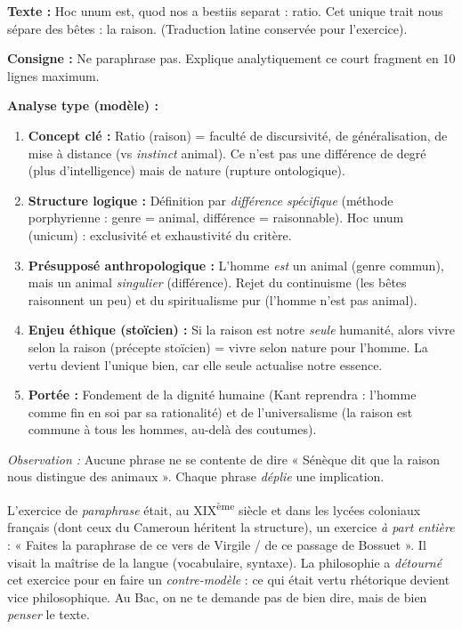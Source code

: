 \documentclass[11pt]{article}
\newcommand{\cle}[1]{{\popxbold\color{popdark}#1}}
\begin{document}
\begin{experience}
\textbf{Texte :} \guillemotleft Hoc unum est, quod nos a bestiis separat : ratio. Cet unique trait nous sépare des bêtes : la raison. \guillemotright (Traduction latine conservée pour l'exercice).

\textbf{Consigne :} Ne paraphrase pas. Explique analytiquement ce court fragment en 10 lignes maximum.

\textbf{Analyse type (modèle) :}
\begin{enumerate}
    \item \textbf{Concept clé :} \cle{Ratio} (raison) = faculté de discursivité, de généralisation, de mise à distance (vs \emph{instinct} animal). Ce n'est pas une différence de degré (plus d'intelligence) mais de \cle{nature} (rupture ontologique).
    \item \textbf{Structure logique :} Définition par \emph{différence spécifique} (méthode porphyrienne : genre = animal, différence = raisonnable). \guillemotleft Hoc unum \guillemotright (unicum) : exclusivité et exhaustivité du critère.
    \item \textbf{Présupposé anthropologique :} L'homme \emph{est} un animal (genre commun), mais un animal \emph{singulier} (différence). Rejet du continuisme (les bêtes raisonnent un peu) et du spiritualisme pur (l'homme n'est pas animal).
    \item \textbf{Enjeu éthique (stoïcien) :} Si la raison est notre \emph{seule} humanité, alors \guillemotleft vivre selon la raison \guillemotright (précepte stoïcien) = \guillemotleft vivre selon nature \guillemotright pour l'homme. La vertu devient l'unique bien, car elle seule actualise notre essence.
    \item \textbf{Portée :} Fondement de la \cle{dignité humaine} (Kant reprendra : l'homme comme fin en soi par sa rationalité) et de l'universalisme (la raison est commune à tous les hommes, au-delà des coutumes).
\end{enumerate}
\textit{Observation :} Aucune phrase ne se contente de dire « Sénèque dit que la raison nous distingue des animaux ». Chaque phrase \emph{déplie} une implication.
\end{experience}

\begin{savaistu}
L'exercice de \emph{paraphrase} était, au XIX\textsuperscript{ème} siècle et dans les lycées coloniaux français (dont ceux du Cameroun héritent la structure), un exercice \emph{à part entière} : « Faites la paraphrase de ce vers de Virgile / de ce passage de Bossuet ». Il visait la maîtrise de la langue (vocabulaire, syntaxe). La philosophie a \emph{détourné} cet exercice pour en faire un \emph{contre-modèle} : ce qui était vertu rhétorique devient vice philosophique. Au Bac, on ne te demande pas de bien dire, mais de bien \emph{penser} le texte.
\end{savaistu}
\end{document}

